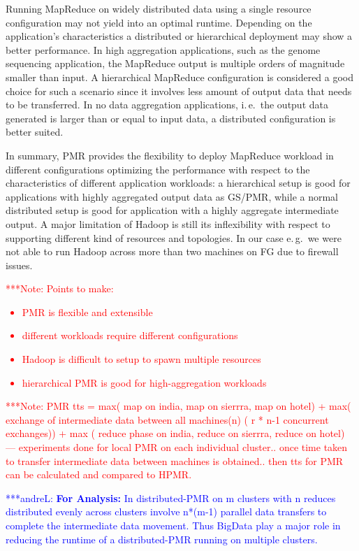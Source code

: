 \documentclass{acm_proc_article-sp}
\newcommand{\alnote}[1]{ {\textcolor{blue} { ***andreL: #1 }}}
\newcommand{\note}[1]{ {\textcolor{red} { ***Note: #1 }}}
\newcommand{\alnote}[1]{}
\newcommand{\note}[1]{}
\begin{document}
Running MapReduce on widely distributed data using a single resource
configuration may not yield into an optimal runtime. Depending on the
application's characteristics a distributed or hierarchical deployment may show
a better performance. In high aggregation applications, such as the genome 
sequencing application, the MapReduce output is multiple orders of magnitude 
smaller than input. A hierarchical MapReduce configuration is considered a good 
choice for such a scenario since it involves less amount of output data that 
needs to be transferred. In no data aggregation applications, i.\,e.\ the 
output data generated is larger than or equal to input data, a distributed 
configuration is better suited. 


In summary, PMR provides the flexibility to deploy MapReduce workload in
different configurations optimizing the performance with respect to the
characteristics of different application workloads: a hierarchical setup is good
for applications with highly aggregated output data as GS/PMR, while a normal
distributed setup is good for application with a highly aggregate intermediate
output. A major limitation of Hadoop is still its inflexibility with respect to
supporting different kind of resources and topologies. In our case e.\,g.\ we
were not able to run Hadoop across more than two machines on FG due to firewall
issues.


\note{Points to make:
\begin{itemize}
	\item PMR is flexible and extensible
	\item different workloads require different configurations
	\item Hadoop is difficult to setup to spawn multiple resources
	\item hierarchical PMR is good for high-aggregation workloads
\end{itemize}}




\note{
PMR tts = max( map  on india, map on  sierrra, map on hotel) + max( exchange of 
intermediate data between all machines(n) ( r * n-1 concurrent exchanges)) + max 
( reduce phase on  india, reduce on  sierrra, reduce on hotel)
--- experiments done for local PMR on each individual cluster.. once time 
taken to transfer intermediate data between machines is obtained.. then tts 
for PMR can be calculated and compared to HPMR.
}

\alnote{\textbf{For Analysis:}
In distributed-PMR on m clusters
with n reduces distributed evenly across clusters involve n*(m-1) parallel data
transfers to complete the intermediate data movement. Thus BigData play a major
role in reducing the runtime of a distributed-PMR running on multiple clusters.
}
\end{document}
